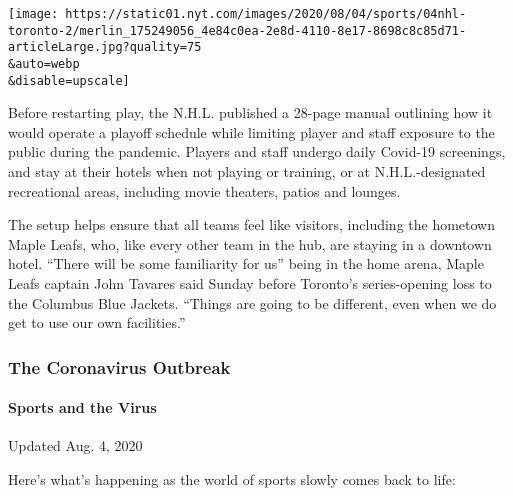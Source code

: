 \texttt{[image: https://static01.nyt.com/images/2020/08/04/sports/04nhl-toronto-2/merlin\_175249056\_4e84c0ea-2e8d-4110-8e17-8698c8c85d71-articleLarge.jpg?quality=75\\\&auto=webp\\\&disable=upscale]}

Before restarting play, the N.H.L. published a 28-page manual outlining
how it would operate a playoff schedule while limiting player and staff
exposure to the public during the pandemic. Players and staff undergo
daily Covid-19 screenings, and stay at their hotels when not playing or
training, or at N.H.L.-designated recreational areas, including movie
theaters, patios and lounges.

The setup helps ensure that all teams feel like visitors, including the
hometown Maple Leafs, who, like every other team in the hub, are staying
in a downtown hotel. ``There will be some familiarity for us'' being in
the home arena, Maple Leafs captain John Tavares said Sunday before
Toronto's series-opening loss to the Columbus Blue Jackets. ``Things are
going to be different, even when we do get to use our own facilities.''

\hypertarget{the-coronavirus-outbreak}{%
\subsubsection{The Coronavirus
Outbreak}\label{the-coronavirus-outbreak}}

\hypertarget{sports-and-the-virus}{%
\paragraph{Sports and the Virus}\label{sports-and-the-virus}}

Updated Aug. 4, 2020

Here's what's happening as the world of sports slowly comes back to
life:

